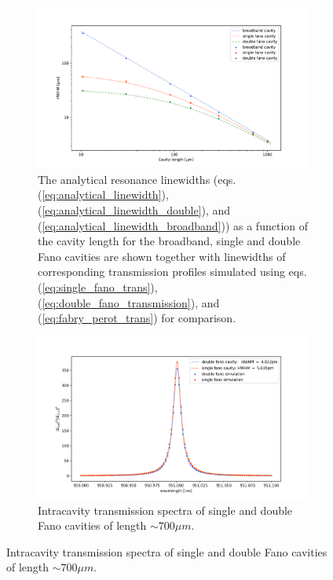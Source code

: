 \begin{figure}[h!]
    \centering
    \begin{subfigure}[c]{0.64\textwidth}
        \centering
        \includegraphics[width=\textwidth]{figures/HWHM_broadband_vs_single_vs_double_sim.pdf}
        \caption{The analytical resonance linewidths (eqs. (\ref{eq:analytical_linewidth}), (\ref{eq:analytical_linewidth_double}), and (\ref{eq:analytical_linewidth_broadband})) as a function of the cavity length for the broadband, single and double Fano cavities are shown together with linewidths of corresponding transmission profiles simulated using eqs. (\ref{eq:single_fano_trans}), (\ref{eq:double_fano_transmission}), and (\ref{eq:fabry_perot_trans}) for comparison.}
        \label{fig:HWHM_double_vs_single_vs_broadband}
    \end{subfigure}
    \begin{subfigure}[c]{0.34\textwidth}
        \includegraphics[width=\textwidth]{figures/sim_single_vs_double_700um.png}
        \caption{Intracavity transmission spectra of single and double Fano cavities of length $\sim 700 \mu m$.}

\end{subfigure}
\end{figure}
